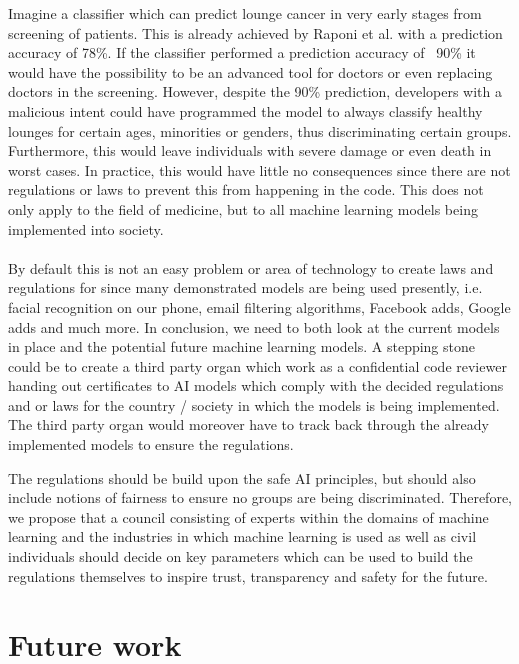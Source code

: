 \documentclass[12pt, fleqn, titlepage]{article}
\newcommand{\1}[1]{\mathds{1}\left[#1\right]}
\begin{document}
Imagine a classifier which can predict lounge cancer in very early stages from screening of patients. This is already achieved by Raponi et al. \cite{raponi} with a prediction accuracy of 78\%. If the classifier performed a prediction accuracy of ~90\% it would have the possibility to be an advanced tool for doctors or even replacing doctors in the screening. However, despite the 90\% prediction, developers with a malicious intent could have programmed the model to always classify healthy lounges for certain ages, minorities or genders, thus discriminating certain groups. Furthermore, this would leave individuals with severe damage or even death in worst cases. In practice, this would have little no consequences since there are not regulations or laws to prevent this from happening in the code. This does not only apply to the field of medicine, but to all machine learning models being implemented into society. 
\\\\
By default this is not an easy problem or area of technology to create laws and regulations for since many demonstrated models are being used presently, i.e. facial recognition on our phone, email filtering algorithms, Facebook adds, Google adds and much more. In conclusion, we need to both look at the current models in place and the potential future machine learning models. A stepping stone could be to create a third party organ which work as a confidential code reviewer handing out certificates to AI models which comply with the decided regulations and or laws for the country / society in which the models is being implemented. The third party organ would moreover have to track back through the already implemented models to ensure the regulations.

The regulations should be build upon the safe AI principles, but should also include notions of fairness to ensure no groups are being discriminated. Therefore, we propose that a council consisting of experts within the domains of machine learning and the industries in which machine learning is used as well as civil individuals should decide on key parameters which can be used to build the regulations themselves to inspire trust, transparency and safety for the future. 

\section{Future work} \label{future_work}

\end{document}
